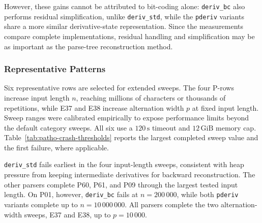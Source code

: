 However, these gains cannot be attributed to
bit-coding alone: \texttt{deriv\_bc} also performs
residual simplification, unlike \texttt{deriv\_std},
while the \texttt{pderiv} variants share a more
similar derivative-state representation.
Since the measurements compare complete implementations,
residual handling and simplification may be as important
as the parse-tree reconstruction method.


%
%
%


\subsubsection{Representative Patterns}
\label{sec:eval-timing-representative}

Six representative rows are selected for extended sweeps.
The four P-rows increase input length $n$, reaching millions
of characters or thousands of repetitions,
while E37 and E38 increase alternation width $p$
at fixed input length.
Sweep ranges were calibrated empirically to expose
performance limits beyond the default category sweeps.
All six use a $120\,\mathrm{s}$ timeout and
$12\,\mathrm{GiB}$ memory cap.
Table~\ref{tab:patho-crash-thresholds}
reports the largest completed sweep value
and the first failure, where applicable.

\texttt{deriv\_std} fails earliest in the four
input-length sweeps, consistent with heap pressure
from keeping intermediate derivatives for
backward reconstruction.
The other parsers complete P60, P61, and P09
through the largest tested input length.
On P01, however, \texttt{deriv\_bc} fails
at $n=200\,000$, while both \texttt{pderiv}
variants complete up to $n=10\,000\,000$.
All parsers complete the two alternation-width
sweeps, E37 and E38, up to $p=10\,000$.

